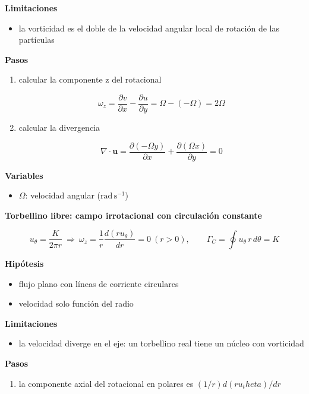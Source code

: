 \documentclass[10pt,openany]{book}
\begin{document}
\begin{tcolorbox}[title={Desarrollos del modelo}, studiumdef, breakable]
\noindent\textbf{Limitaciones}
\begin{itemize}
\item la vorticidad es el doble de la velocidad angular local de rotación de las partículas
\end{itemize}

\noindent\textbf{Pasos}
\begin{enumerate}
\item
calcular la componente z del rotacional

\[
\omega_z = \frac{\partial v}{\partial x} - \frac{\partial u}{\partial y} = \Omega - (-\Omega) = 2\Omega
\]
\item
calcular la divergencia

\[
\nabla\cdot\mathbf{u} = \frac{\partial(-\Omega y)}{\partial x} + \frac{\partial(\Omega x)}{\partial y} = 0
\]
\end{enumerate}

\noindent\textbf{Variables}
\begin{itemize}
\item $\Omega$: velocidad angular ($\mathrm{rad}\,\mathrm{s}^{-1}$)
\end{itemize}



\noindent\textbf{Torbellino libre: campo irrotacional con circulación constante}

\begin{equation}
u_\theta = \frac{K}{2\pi r}\ \Rightarrow\ \omega_z = \frac{1}{r}\frac{d(r u_\theta)}{dr} = 0\ (r > 0),\qquad \Gamma_C = \oint u_\theta\,r\,d\theta = K
\label{eq:c11-torbellino}
\end{equation}

\noindent\textbf{Hipótesis}
\begin{itemize}
\item flujo plano con líneas de corriente circulares
\item velocidad solo función del radio
\end{itemize}

\noindent\textbf{Limitaciones}
\begin{itemize}
\item la velocidad diverge en el eje: un torbellino real tiene un núcleo con vorticidad
\end{itemize}

\noindent\textbf{Pasos}
\begin{enumerate}
\item
la componente axial del rotacional en polares es \((1/r) d(r u_theta)/dr\)


\end{enumerate}
\end{tcolorbox}
\end{document}
